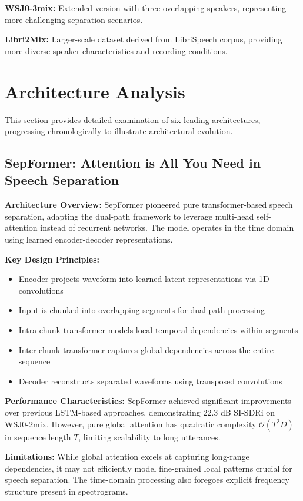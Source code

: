 \documentclass[conference]{IEEEtran}
\begin{document}
\textbf{WSJ0-3mix:} Extended version with three overlapping speakers, representing more challenging separation scenarios.

\textbf{Libri2Mix:} Larger-scale dataset derived from LibriSpeech corpus, providing more diverse speaker characteristics and recording conditions.

\section{Architecture Analysis}

This section provides detailed examination of six leading architectures, progressing chronologically to illustrate architectural evolution.

\subsection{SepFormer: Attention is All You Need in Speech Separation}

\textbf{Architecture Overview:} SepFormer \cite{subakan2021attention} pioneered pure transformer-based speech separation, adapting the dual-path framework to leverage multi-head self-attention instead of recurrent networks. The model operates in the time domain using learned encoder-decoder representations.

\textbf{Key Design Principles:}
\begin{itemize}
    \item Encoder projects waveform into learned latent representations via 1D convolutions
    \item Input is chunked into overlapping segments for dual-path processing
    \item Intra-chunk transformer models local temporal dependencies within segments
    \item Inter-chunk transformer captures global dependencies across the entire sequence
    \item Decoder reconstructs separated waveforms using transposed convolutions
\end{itemize}

\textbf{Performance Characteristics:} SepFormer achieved significant improvements over previous LSTM-based approaches, demonstrating 22.3 dB SI-SDRi on WSJ0-2mix. However, pure global attention has quadratic complexity $\mathcal{O}(T^2D)$ in sequence length $T$, limiting scalability to long utterances.

\textbf{Limitations:} While global attention excels at capturing long-range dependencies, it may not efficiently model fine-grained local patterns crucial for speech separation. The time-domain processing also foregoes explicit frequency structure present in spectrograms.
\end{document}
